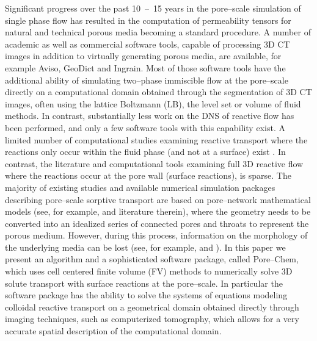 \documentclass[preprint, 1p, authoryear]{elsarticle}
\begin{document}
Significant progress  over the past 10~--~15 years  in the pore--scale simulation of single phase flow has resulted in the  computation of  permeability tensors for natural and technical porous media becoming  a standard procedure. A number of academic as well as commercial software tools, capable of processing 3D CT images in addition to virtually generating porous media, are available,  for example Aviso, GeoDict and Ingrain.  Most of those software tools have the additional ability of simulating  two--phase immiscible flow at the pore--scale directly on  a computational domain obtained through the segmentation of   3D CT images, often  using  the lattice Boltzmann (LB), the level set  or  volume of fluid methods.  In contrast, substantially less work on the DNS of reactive flow has been performed, and only a few  software tools with this capability exist. 
A limited number of computational studies examining  reactive transport where the reactions only occur within the fluid phase (and not at a surface) exist \citep{Molins2012Investigation, Shen2011High}.    
In contrast, the literature and computational tools examining full 3D reactive flow where  the reactions occur at the pore wall (surface reactions), is sparse. The majority of existing  studies and available numerical simulation packages describing pore--scale sorptive transport are based on pore--network mathematical models (see, for example,  \citet{Raoof2011Upscaling, Adler2013} and literature therein), where the geometry needs to be converted into an idealized series of connected pores and throats to represent the porous medium. However, during this process, information on the morphology of the underlying media can be lost (see, for example, \citet{Raoof2011Upscaling} and \citet{Lichtner2007Upscaling}). In this paper we present an algorithm and a sophisticated software package, called Pore--Chem, which 
uses cell centered finite volume (FV) methods to numerically solve 3D solute transport with surface 
reactions at the pore--scale. 
In particular the software package has the ability to solve the systems of equations modeling colloidal 
reactive transport on a geometrical domain obtained directly through imaging techniques, such as 
computerized tomography, which allows for a very accurate spatial description of the computational 
domain. 
\end{document}
